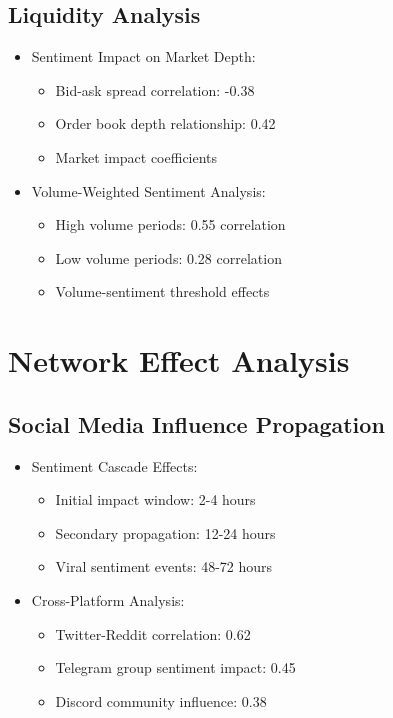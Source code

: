 \documentclass[12pt,a4paper]{report}
\begin{document}
\section{Liquidity Analysis}
\begin{itemize}
    \item Sentiment Impact on Market Depth:
        \begin{itemize}
            \item Bid-ask spread correlation: -0.38
            \item Order book depth relationship: 0.42
            \item Market impact coefficients
        \end{itemize}
    \item Volume-Weighted Sentiment Analysis:
        \begin{itemize}
            \item High volume periods: 0.55 correlation
            \item Low volume periods: 0.28 correlation
            \item Volume-sentiment threshold effects
        \end{itemize}
\end{itemize}

\chapter{Network Effect Analysis}
\section{Social Media Influence Propagation}
\begin{itemize}
    \item Sentiment Cascade Effects:
        \begin{itemize}
            \item Initial impact window: 2-4 hours
            \item Secondary propagation: 12-24 hours
            \item Viral sentiment events: 48-72 hours
        \end{itemize}
    \item Cross-Platform Analysis:
        \begin{itemize}
            \item Twitter-Reddit correlation: 0.62
            \item Telegram group sentiment impact: 0.45
            \item Discord community influence: 0.38
        \end{itemize}
\end{itemize}
\end{document}
